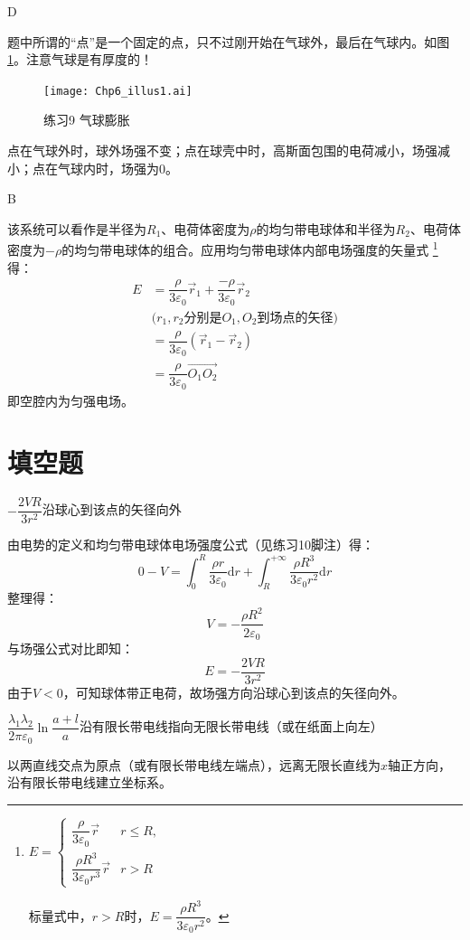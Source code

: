 \documentclass[b5paper,opensource,sourcefont,parskip]{qyxf-book}
\newcommand{\di}[1]{\mathrm{d}#1}
\begin{document}
D

\solve
题中所谓的“点”是一个固定的点，只不过刚开始在气球外，最后在气球内。如图\ref{fig:c6-t9}。注意气球是有厚度的！
\begin{figure}[!htbp]
	\centering
	\texttt{[image: Chp6\_illus1.ai]}
	\caption{练习9 气球膨胀}\label{fig:c6-t9}
\end{figure}
点在气球外时，球外场强不变；点在球壳中时，高斯面包围的电荷减小，场强减小；点在气球内时，场强为0。

B

\solve
该系统可以看作是半径为$R_1$、电荷体密度为$\rho$的均匀带电球体和半径为$R_2$、电荷体密度为$-\rho$的均匀带电球体的组合。应用均匀带电球体内部电场强度的矢量式
\footnote{
	$E=
	\begin{cases}
	\dfrac{\rho}{3\varepsilon_0}\vec{r} & r\leqslant R,\\
	\dfrac{\rho R^3}{3\varepsilon_0 r^3}\vec{r} & r > R
	\end{cases}$

	标量式中，$r>R$时，$E=\dfrac{\rho R^3}{3\varepsilon_0 r^2}$。
}得：
\begin{align*}
	E&=\dfrac{\rho}{3\varepsilon_0}\vec{r}_1+\dfrac{-\rho}{3\varepsilon_0}\vec{r}_2\\
	&\text{($r_1,r_2$分别是$O_1,O_2$到场点的矢径)}\\
	&=\dfrac{\rho}{3\varepsilon_0}(\vec{r}_1-\vec{r}_2)\\
	&=\dfrac{\rho}{3\varepsilon_0}\overrightarrow{O_1O_2}
\end{align*}
即空腔内为匀强电场。

\section{填空题}

$-\dfrac{2VR}{3r^2}$\quad 沿球心到该点的矢径向外

\solve
由电势的定义和均匀带电球体电场强度公式（见练习10脚注）得：
\[
0-V=\int_{0}^{R}\dfrac{\rho r}{3\varepsilon_0}\di{r}+\int_{R}^{+\infty}\dfrac{\rho R^3}{3\varepsilon_0 r^2}\di{r}
\]
整理得：
\[
V=-\dfrac{\rho R^2}{2\varepsilon_0}
\]
与场强公式对比即知：
\[
E=-\dfrac{2VR}{3r^2}
\]
由于$V<0$，可知球体带正电荷，故场强方向沿球心到该点的矢径向外。

$\dfrac{\lambda_1\lambda_2}{2\pi \varepsilon_0}\ln\dfrac{a+l}{a}$\quad 沿有限长带电线指向无限长带电线（或在纸面上向左）

\solve
以两直线交点为原点（或有限长带电线左端点），远离无限长直线为$x$轴正方向，沿有限长带电线建立坐标系。
\end{document}
